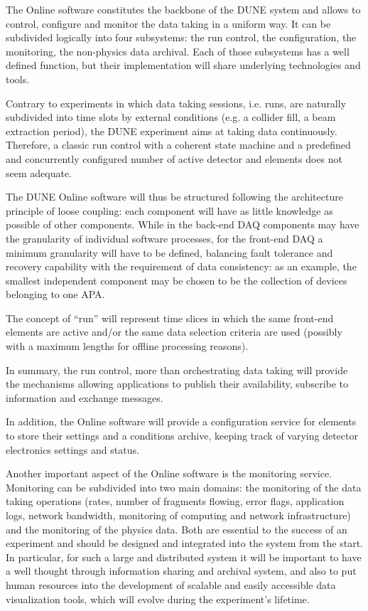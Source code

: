 
The Online software constitutes the backbone of the DUNE 
system and allows to control, configure and monitor the data taking in
a uniform way.
It can be subdivided logically into four subsystems: the run control,
the configuration, the monitoring, the non-physics data archival.
Each of those subsystems has a well defined function, but their
implementation will share underlying technologies and tools.

Contrary to experiments in which data taking sessions, i.e. runs, are
naturally subdivided into time slots by external conditions (e.g. a
collider fill, a beam extraction period), the DUNE experiment aims at
taking data continuously.
Therefore, a classic run control with a coherent state machine and a
predefined and concurrently configured number of active detector and
 elements does not seem adequate. 

The DUNE Online software will thus be structured following the
architecture principle of loose coupling: each component will have as
little knowledge as possible of other components.
While in the back-end DAQ components may have the granularity of
individual software processes, for the front-end DAQ a minimum
granularity will have to be defined, balancing fault tolerance and
recovery capability with the requirement of data consistency: as an
example, the smallest independent component may be chosen to be the
collection of devices belonging to one APA.

The concept of ``run'' will represent time slices in which the same
front-end elements are active and/or the same data selection criteria
are used (possibly with a maximum lengths for offline processing
reasons). 

In summary, the run control, more than orchestrating data taking will
provide the mechanisms allowing  applications to publish
their availability, subscribe to information and exchange messages. 

In addition, the Online software will provide a configuration service
for  elements to store their settings and a conditions
archive, keeping track of varying detector electronics settings and
status.

Another important aspect of the Online software is the monitoring
service.
Monitoring can be subdivided into two main domains: the monitoring of
the data taking operations (rates, number of fragments flowing, error
flags, application logs, network bandwidth, monitoring of computing
and network infrastructure) and the monitoring of the physics data.
Both are essential to the success of an experiment and should be
designed and integrated into the  system from the start.
In particular, for such a large and distributed system it will be
important to have a well thought through information sharing and
archival system, and also to put human resources into the development
of scalable and easily accessible data visualization tools, which will
evolve during the experiment’s lifetime.

